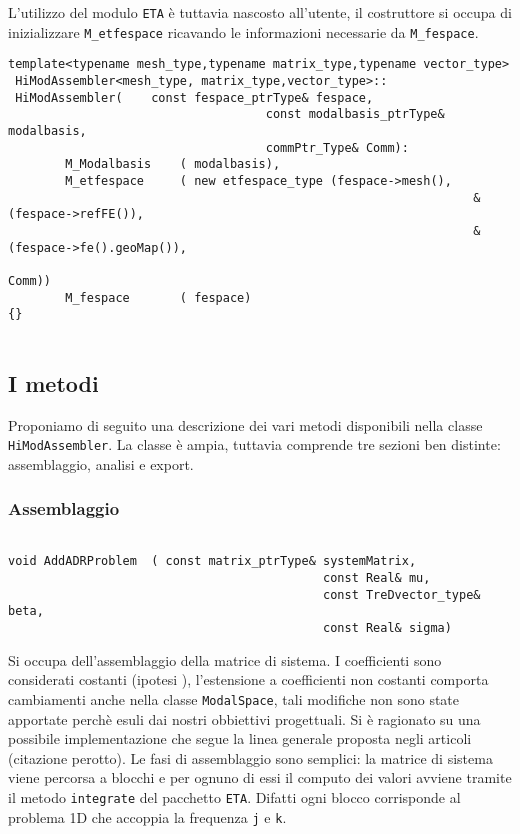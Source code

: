 L'utilizzo del modulo \texttt{ETA} \`e tuttavia nascosto all'utente, il costruttore si occupa di inizializzare \texttt{M\_etfespace} ricavando le informazioni necessarie da \texttt{M\_fespace}.

\begin{lstlisting}[style=general]
 template<typename mesh_type,typename matrix_type,typename vector_type>
 HiModAssembler<mesh_type, matrix_type,vector_type>::
 HiModAssembler(	const fespace_ptrType& fespace,
 									const modalbasis_ptrType& modalbasis,
 									commPtr_Type& Comm):
 		M_Modalbasis	( modalbasis),
 		M_etfespace 	( new etfespace_type (fespace->mesh(),
 																 &(fespace->refFE()),
 																 &(fespace->fe().geoMap()),
 																 Comm))
		M_fespace		( fespace)
{} 																 
 																
\end{lstlisting}

\subsection{I metodi}
Proponiamo di seguito una descrizione dei vari metodi disponibili nella classe \texttt{HiModAssembler}. La classe \`e ampia, tuttavia comprende tre sezioni ben distinte: assemblaggio, analisi e export.
\subsubsection{Assemblaggio}
\begin{lstlisting}[style=general, frame = top]

void AddADRProblem	( const matrix_ptrType& systemMatrix,
											const Real& mu, 
											const TreDvector_type& beta, 
											const Real& sigma)
\end{lstlisting}
Si occupa dell'assemblaggio della matrice di sistema. I coefficienti sono considerati costanti (ipotesi ), l'estensione a coefficienti non costanti comporta cambiamenti anche nella classe \texttt{ModalSpace}, tali modifiche non sono state apportate perch\`e esuli dai nostri obbiettivi progettuali. Si \`e ragionato su una possibile implementazione che segue la linea generale proposta negli articoli (citazione perotto).
Le fasi di assemblaggio sono semplici: la matrice di sistema viene percorsa a blocchi e per ognuno di essi il computo dei valori avviene tramite il metodo \texttt{integrate} del pacchetto \texttt{ETA}. Difatti ogni blocco corrisponde al problema 1D che accoppia la frequenza \texttt{j} e \texttt{k}.

